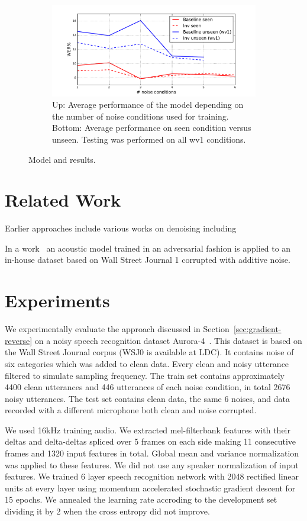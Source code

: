 \documentclass{article}
\begin{document}
\begin{figure}
\begin{subfigure}[b]{0.7\linewidth}
        \includegraphics[width=\linewidth]{wer_seen_unseen.pdf}
        \caption{Up: Average performance of the model depending on the number of noise
            conditions used for training. Bottom: Average performance on seen condition versus unseen.
            Testing was performed on all wv1 conditions.
            }
        \label{fig:results}
    \end{subfigure}
    \caption{Model and results.}
\end{figure}

\section{Related Work}
    Earlier approaches include various works on denoising including 

    In a work~\cite{yusuke2016adversarial} an acoustic model trained in an adversarial fashion is
    applied to an in-house dataset based on Wall Street Journal 1 corrupted with additive noise.
    

\section{Experiments}
\label{sec:experiments}
We experimentally evaluate the approach discussed in Section~\ref{sec:gradient-reverse} 
on a noisy speech recognition dataset Aurora-4~\cite{parihar2002aurora}. This dataset
is based on the Wall Street Journal corpus (WSJ0 is available at LDC). It contains noise of 
six categories which was added to clean
data. Every clean and noisy utterance filtered to simulate sampling frequency. The train
set contains approximately 4400 clean utterances and 446 utterances of each noise condition,
in total 2676 noisy utterances.
The test
set contains clean data, the same 6 noises, and data recorded with a different microphone
both clean and noise corrupted.

We used 16kHz training audio. We extracted mel-filterbank features with their deltas and 
delta-deltas spliced over 5 frames on each side making 11 consecutive frames and 1320 input 
features in total. Global mean and variance normalization was applied to these features.
We did not use any speaker normalization of input features. We trained 6 layer
speech recognition network with 2048 rectified linear units at every layer using momentum
accelerated stochastic gradient descent for 15 epochs. We annealed the learning rate accroding 
to the development set dividing it by 2 when the cross entropy did not improve.
\end{document}
